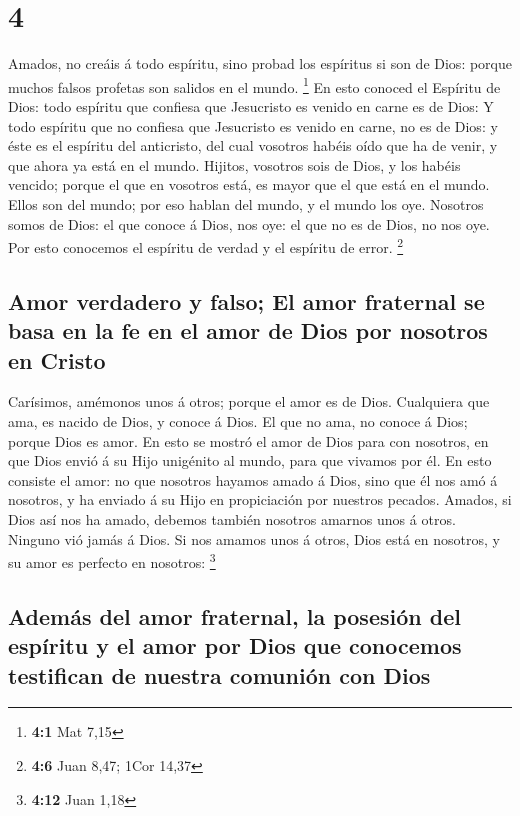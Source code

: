 \hypertarget{section-3}{%
\section{4}\label{section-3}}

 Amados, no creáis á todo espíritu, sino probad los
espíritus si son de Dios: porque muchos falsos profetas son salidos en
el mundo. \footnote{\textbf{4:1} Mat 7,15}  En esto conoced
el Espíritu de Dios: todo espíritu que confiesa que Jesucristo es venido
en carne es de Dios:  Y todo espíritu que no confiesa que
Jesucristo es venido en carne, no es de Dios: y éste es el espíritu del
anticristo, del cual vosotros habéis oído que ha de venir, y que ahora
ya está en el mundo.  Hijitos, vosotros sois de Dios, y los
habéis vencido; porque el que en vosotros está, es mayor que el que está
en el mundo.  Ellos son del mundo; por eso hablan del mundo,
y el mundo los oye.  Nosotros somos de Dios: el que conoce á
Dios, nos oye: el que no es de Dios, no nos oye. Por esto conocemos el
espíritu de verdad y el espíritu de error. \footnote{\textbf{4:6} Juan
  8,47; 1Cor 14,37}

\hypertarget{amor-verdadero-y-falso-el-amor-fraternal-se-basa-en-la-fe-en-el-amor-de-dios-por-nosotros-en-cristo}{%
\subsection{Amor verdadero y falso; El amor fraternal se basa en la fe
en el amor de Dios por nosotros en
Cristo}\label{amor-verdadero-y-falso-el-amor-fraternal-se-basa-en-la-fe-en-el-amor-de-dios-por-nosotros-en-cristo}}

 Carísimos, amémonos unos á otros; porque el amor es de
Dios. Cualquiera que ama, es nacido de Dios, y conoce á Dios.
 El que no ama, no conoce á Dios; porque Dios es amor.
 En esto se mostró el amor de Dios para con nosotros, en que
Dios envió á su Hijo unigénito al mundo, para que vivamos por él.
 En esto consiste el amor: no que nosotros hayamos amado á
Dios, sino que él nos amó á nosotros, y ha enviado á su Hijo en
propiciación por nuestros pecados.  Amados, si Dios así nos
ha amado, debemos también nosotros amarnos unos á otros. 
Ninguno vió jamás á Dios. Si nos amamos unos á otros, Dios está en
nosotros, y su amor es perfecto en nosotros: \footnote{\textbf{4:12}
  Juan 1,18}

\hypertarget{ademuxe1s-del-amor-fraternal-la-posesiuxf3n-del-espuxedritu-y-el-amor-por-dios-que-conocemos-testifican-de-nuestra-comuniuxf3n-con-dios}{%
\subsection{Además del amor fraternal, la posesión del espíritu y el
amor por Dios que conocemos testifican de nuestra comunión con
Dios}\label{ademuxe1s-del-amor-fraternal-la-posesiuxf3n-del-espuxedritu-y-el-amor-por-dios-que-conocemos-testifican-de-nuestra-comuniuxf3n-con-dios}}

